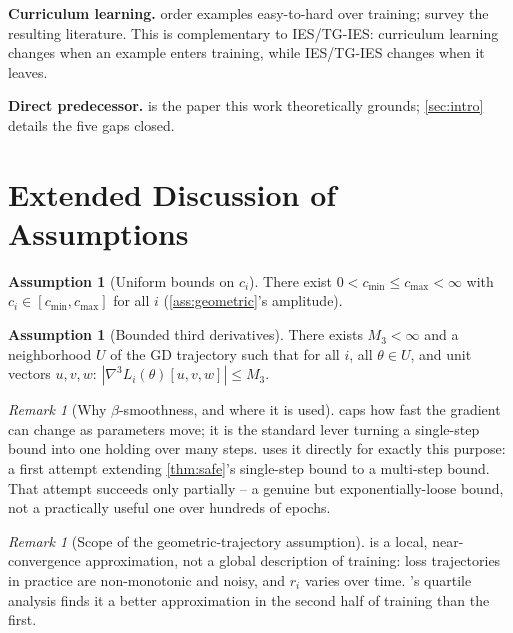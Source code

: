 \documentclass{article}
\theoremstyle{plain}
\theoremstyle{definition}
\newtheorem{assumption}[theorem]{Assumption}
\theoremstyle{remark}
\newtheorem{remark}[theorem]{Remark}
\begin{document}
\textbf{Curriculum learning.} \citet{bengio2009curriculum} order examples easy-to-hard over training; \citet{soviany2022curriculum} survey the resulting literature. This is complementary to IES/TG-IES: curriculum learning changes when an example enters training, while IES/TG-IES changes when it leaves.

\textbf{Direct predecessor.} \citet{yuan2025instance} is the paper this work theoretically grounds; \cref{sec:intro} details the five gaps closed.

\section{Extended Discussion of Assumptions}
\label{app:assumptions-extended}

\begin{assumption}[Uniform bounds on $c_i$]
\label{ass:cbounds}
There exist $0 < c_{\min} \le c_{\max} < \infty$ with $c_i \in [c_{\min},c_{\max}]$ for all $i$ (\cref{ass:geometric}'s amplitude).
\end{assumption}

\begin{assumption}[Bounded third derivatives]
\label{ass:thirdderiv}
There exists $M_3<\infty$ and a neighborhood $U$ of the GD trajectory such that for all $i$, all $\theta\in U$, and unit vectors $u,v,w$: $|\nabla^3 L_i(\theta)[u,v,w]| \le M_3$.
\end{assumption}

\begin{remark}[Why $\beta$-smoothness, and where it is used]
 caps how fast the gradient can change as parameters move; it is the standard lever turning a single-step bound into one holding over many steps.  uses it directly for exactly this purpose: a first attempt extending \cref{thm:safe}'s single-step bound to a multi-step bound. That attempt succeeds only partially -- a genuine but exponentially-loose bound, not a practically useful one over hundreds of epochs.
\end{remark}

\begin{remark}[Scope of the geometric-trajectory assumption]
 is a local, near-convergence approximation, not a global description of training: loss trajectories in practice are non-monotonic and noisy, and $r_i$ varies over time. 's quartile analysis finds it a better approximation in the second half of training than the first.
\end{remark}
\end{document}
